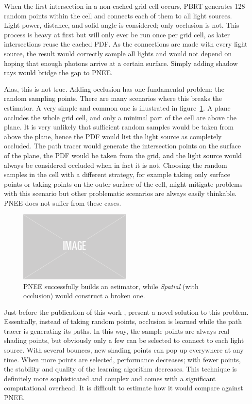 When the first intersection in a non-cached grid cell occurs, PBRT generates 128 random points within the cell and connects each of them to all light sources. Light power, distance, and solid angle is considered; only occlusion is not. This process is heavy at first but will only ever be run once per grid cell, as later intersections reuse the cached PDF. As the connections are made with every light source, the result would correctly sample all lights and would not depend on hoping that enough photons arrive at a certain surface. Simply adding shadow rays would bridge the gap to PNEE.

Alas, this is not true. Adding occlusion has one fundamental problem: the random sampling points. There are many scenarios where this breaks the estimator. A very simple and common one is illustrated in figure~\ref{fig:pbrtoccl}. A plane occludes the whole grid cell, and only a minimal part of the cell are above the plane. It is very unlikely that sufficient random samples would be taken from above the plane, hence the PDF would list the light source as completely occluded. The path tracer would generate the intersection points on the surface of the plane, the PDF would be taken from the grid, and the light source would always be considered occluded when in fact it is not. Choosing the random samples in the cell with a different strategy, for example taking only surface points or taking points on the outer surface of the cell, might mitigate problems with this scenario but other problematic scenarios are always easily thinkable. PNEE does not suffer from these cases.

\begin{figure}
    \centering
    \includegraphics[width=0.5\textwidth]{figures/img-placeholder.png}
    \caption{PNEE successfully builds an estimator, while \textit{Spatial} (with occlusion) would construct a broken one.}
    \label{fig:pbrtoccl}
\end{figure}

Just before the publication of this work \textcite{Vevoda:2018:BOR}, present a novel solution to this problem. Essentially, instead of taking random points, occlusion is learned while the path tracer is generating its paths. In this way, the sample points are always real shading points, but obviously only a few can be selected to connect to each light source. With several bounces, new shading points can pop up everywhere at any time. When more points are selected, performance decreases; with fewer points, the stability and quality of the learning algorithm decreases. This technique is definitely more sophisticated and complex and comes with a significant computational overhead. It is difficult to estimate how it would compare against PNEE.